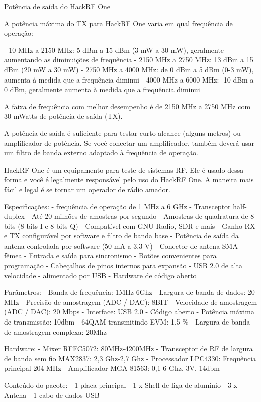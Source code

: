 \documentclass[
  12pt,				%
  openright,			%
  twoside,			%
  a4paper,			%
  english,			%
  french,				%
  spanish,			%
  brazil,				%
  ]{abntex2}
\begin{document}
Potência de saída do HackRF One

A potência máxima do TX para HackRF One varia em qual frequência de operação:

- 10 MHz a 2150 MHz: 5 dBm a 15 dBm (3 mW a 30 mW), geralmente aumentando as diminuições de frequência
- 2150 MHz a 2750 MHz: 13 dBm a 15 dBm (20 mW a 30 mW)
- 2750 MHz a 4000 MHz: de 0 dBm a 5 dBm (0-3 mW), aumenta à medida que a frequência diminui
- 4000 MHz a 6000 MHz: -10 dBm a 0 dBm, geralmente aumenta à medida que a frequência diminui

A faixa de frequência com melhor desempenho é de 2150 MHz a 2750 MHz com 30 mWatts de potência de saída (TX).

A potência de saída é suficiente para testar curto alcance (alguns metros) ou amplificador de potência. Se você conectar um amplificador, também deverá
usar um filtro de banda externo adaptado à frequência de operação.

HackRF One é um equipamento para teste de sistemas RF. Ele é usado dessa forma e você é legalmente responsável pelo uso do HackRF One. A maneira mais
fácil e legal é se tornar um operador de rádio amador.


Especificações:
- frequência de operação de 1 MHz a 6 GHz
- Transceptor half-duplex
- Até 20 milhões de amostras por segundo
- Amostras de quadratura de 8 bits (8 bits I e 8 bits Q)
- Compatível com GNU Radio, SDR e mais
- Ganho RX e TX configurável por software e filtro de banda base
- Potência de saída da antena controlada por software (50 mA a 3,3 V)
- Conector de antena SMA fêmea
- Entrada e saída para sincronismo
- Botões convenientes para programação
- Cabeçalhos de pinos internos para expansão
- USB 2.0 de alta velocidade
- alimentado por USB
- Hardware de código aberto

Parâmetros:
- Banda de frequência: 1MHz-6Ghz
- Largura de banda de dados: 20 MHz
- Precisão de amostragem (ADC / DAC): 8BIT
- Velocidade de amostragem (ADC / DAC): 20 Mbps
- Interface: USB 2.0
- Código aberto
- Potência máxima de transmissão: 10dbm
- 64QAM transmitindo EVM: 1,5 \%
- Largura de banda de amostragem complexa: 20Mhz

Hardware:
- Mixer RFFC5072: 80MHz-4200MHz
- Transceptor de RF de largura de banda sem fio MAX2837: 2,3 Ghz-2,7 Ghz
- Processador LPC4330: Frequência principal 204 MHz
- Amplificador MGA-81563: 0,1-6 Ghz, 3V, 14dbm

Conteúdo do pacote:
- 1 placa principal
- 1 x Shell de liga de alumínio
- 3 x Antena
- 1 cabo de dados USB
\end{document}
